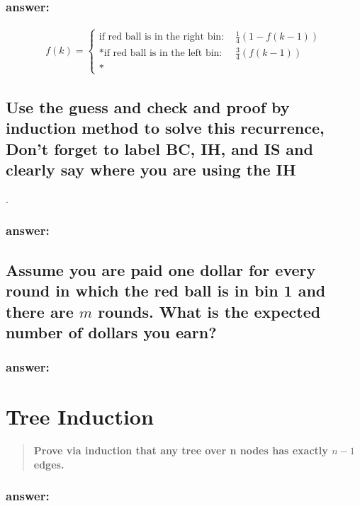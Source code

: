 \documentclass[titlepage]{article}\usepackage[]{graphicx}\usepackage[]{color}
\theoremstyle{definition}
\begin{document}
\subsubsection{answer:}
\vspace{4cm}
\begin{align}
  f(k) = 
	\begin{cases}
          \text{if red ball is in the right bin: } & \frac{1}{4}\left(1 - f(k-1)\right) \\*
          \text{if red ball is in the left bin: }  & \frac{3}{4} \left( f(k-1) \right) \\*	
	\end{cases}
\end{align}

\vspace{8cm}


\subsection{Use the guess and check and proof by induction method to solve this
	recurrence, Don't forget to label BC, IH, and IS and clearly say where you
	are using the IH}.
\subsubsection{answer:}
\vspace{8cm}


\subsection{Assume you are paid one dollar for every round in which the red
	ball is in bin 1 and there are $m$ rounds. What is the expected number of
dollars you earn?}
\subsubsection{answer:}
\vspace{8cm}


\section{Tree Induction}
\begin{quote}
  \textbf{Prove via induction that any tree over n nodes has exactly $n-1$
  edges. }
\end{quote}

\subsubsection{answer:}
\end{document}
